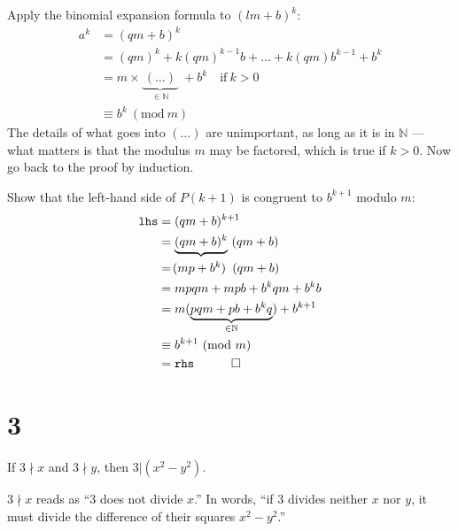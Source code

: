 \documentclass[12pt]{article}
\newcommand{\modulo}[1]{~(\mathrm{mod}~#1)}
\begin{document}
Apply the binomial expansion formula to $(lm+b)^{k}$:
\begin{align*}
a^{k} 
  & = (qm + b)^{k} \\
  & = (qm)^{k} + k (qm)^{k-1}b + \ldots + k (qm)b^{k-1} + b^{k} \\
  & = m \times \underbrace{~(\ldots)~}_{\in\mathbb{N}}~ + b^{k} \quad\text{if}~k>0\\
  & \equiv b^{k} \modulo{m}
\end{align*}
The details of what goes into $(\ldots)$ are unimportant, as long as it is in $\mathbb{N}$ --- what matters is that the modulus $m$ may be factored, which is true if $k>0$. Now go back to the proof by induction. 


Show that the left-hand side of $P(k+1)$ is congruent to $b^{k+1}$ modulo $m$:
\begin{align*}
\texttt{lhs} 
  & = (qm + b)^{k+1} \\
  & = \underbrace{(qm + b)^{k}}~(qm + b) \\
  & = \makebox[4em]{$(mp+b^{k})$}~~(qm + b) \\
  & = mpqm + mpb + b^{k}qm + b^{k}b \\
  & = m (\underbrace{pqm + pb + b^{k}q}_{\in\mathbb{N}}) +b^{k+1} \\
  & \equiv b^{k+1} \modulo{m} \\
  & = \texttt{rhs} \quad \qed 
\end{align*}



\clearpage
\section*{3}
\begin{question}
If $3\nmid x$ and $3\nmid y$, then $3|(x^{2}-y^{2})$. 
\end{question}

$3\nmid x$ reads as ``$3$ does not divide $x$.'' In words, ``if $3$ divides neither $x$ nor $y$, it must divide the difference of their squares $x^{2}-y^{2}$.''
\end{document}
